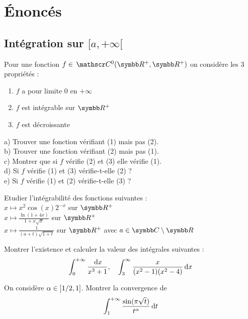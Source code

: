 \section{Énoncés}

\subsection{Intégration sur \texorpdfstring{$[a,+\infty[$}{[a, +infini[}}

\begin{exercice}
Pour une fonction $f\in \mc{0}(\R^{+},\R^{+})$ on considère les 3 propriétés :
\begin{enumerate}
    \item[(1)] $f$ a pour limite 0 en $+\infty$
    \item[(2)] $f$ est intégrable sur $\R^{+}$
    \item[(3)] $f$ est décroissante
\end{enumerate}
a) Trouver une fonction vérifiant (1) mais pas (2). \\
b) Trouver une fonction vérifiant (2) mais pas (1). \\
c) Montrer que si $f$ vérifie (2) et (3) elle vérifie (1). \\
d) Si $f$ vérifie (1) et (3) vérifie-t-elle (2) ? \\
e) Si $f$ vérifie (1) et (2) vérifie-t-elle (3) ?
\end{exercice}

\begin{exercice}
Etudier l'intégrabilité des fonctions suivantes : \\
$x\mapsto x^{2}\cos(x)2^{-x}$ sur $\R^{+}$ \\
$x\mapsto \frac{\ln(1+4x)}{1+x\sqrt{x}}$ sur $\R^{+}$ \\
$x\mapsto \frac{1}{(a+t)\sqrt{1+t}}$ sur $\R^{+}$ avec $a\in\C\setminus\R$
\end{exercice}

\begin{exercice}
Montrer l'existence et calculer la valeur des intégrales suivantes :
$$ \int_{0}^{+\infty}\frac{\,\mathrm{d}x}{x^{3}+1}, \quad \int_{3}^{\infty}\frac{x}{(x^{2}-1)(x^{2}-4)}\,\mathrm{d}x $$
\end{exercice}

\begin{exercice}
On considère $\alpha\in\left]1/2, 1\right]$. Montrer la convergence de
$$ \int_{1}^{+\infty}\frac{\sin(\pi\sqrt{t})}{t^{\alpha}}\,\mathrm{d}t $$
\end{exercice}

